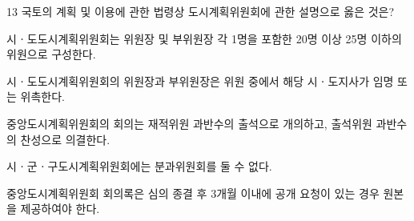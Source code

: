 \begin{question}{13}
국토의 계획 및 이용에 관한 법령상 도시계획위원회에 관한 설명으로 옳은 것은?
\begin{choices}
  \item 시ㆍ도도시계획위원회는 위원장 및 부위원장 각 1명을 포함한 20명 이상 25명 이하의 위원으로 구성한다.
  \item 시ㆍ도도시계획위원회의 위원장과 부위원장은 위원 중에서 해당 시ㆍ도지사가 임명 또는 위촉한다.
  \item 중앙도시계획위원회의 회의는 재적위원 과반수의 출석으로 개의하고, 출석위원 과반수의 찬성으로 의결한다.
  \item 시ㆍ군ㆍ구도시계획위원회에는 분과위원회를 둘 수 없다.
  \item 중앙도시계획위원회 회의록은 심의 종결 후 3개월 이내에 공개 요청이 있는 경우 원본을 제공하여야 한다.
\end{choices}
\end{question}

